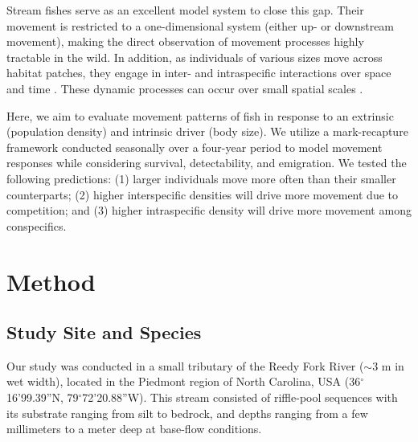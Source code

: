 \documentclass[11pt, class=article, crop=false]{standalone}
\begin{document}
Stream fishes serve as an excellent model system to close this gap. Their movement is restricted to a one-dimensional system (either up- or downstream movement), making the direct observation of movement processes highly tractable in the wild. In addition, as individuals of various sizes move across habitat patches, they engage in inter- and intraspecific interactions over space and time \citep{brownHabitatHeterogeneityActivity2010, davidsonSeasonalSpatialHydrological2012, robinsonEffectsMultiyearExperimental2003, albaneseEcologicalCorrelatesFish2004, nakayamaFinescaleMovementEcology2018, pettyRestrictedMovementMottled2004, robertsSpatiotemporalVariabilityStream2007}. These dynamic processes can occur over small spatial scales \citep{teruiNonrandomDispersalSympatric2021}. 

Here, we aim to evaluate movement patterns of fish in response to an extrinsic (population density) and intrinsic driver (body size). We utilize a mark-recapture framework conducted seasonally over a four-year period to model movement responses while considering survival, detectability, and emigration. We tested the following predictions:  (1) larger individuals move more often than their smaller counterparts; (2) higher interspecific densities will drive more movement due to competition; and (3) higher intraspecific density will drive more movement among conspecifics.

\section{Method}

\subsection{Study Site and Species}

Our study was conducted in a small tributary of the Reedy Fork River ($\sim$3 m in wet width), located in the Piedmont region of North Carolina, USA (36$^\circ$16’99.39”N, 79$^\circ$72’20.88”W). This stream consisted of riffle-pool sequences with its substrate ranging from silt to bedrock, and depths ranging from a few millimeters to a meter deep at base-flow conditions. 
\end{document}
